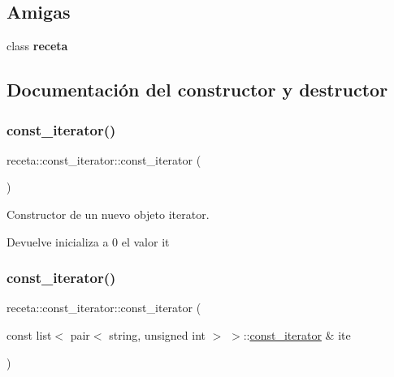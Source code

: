 \subsection*{Amigas}
\begin{DoxyCompactItemize}
\item 
\mbox{\label{classreceta_1_1const__iterator_a9843fe65258faad543f6aba1e066f9ac}} 
class {\bfseries receta}
\end{DoxyCompactItemize}


\subsection{Documentación del constructor y destructor}
\mbox{\label{classreceta_1_1const__iterator_aa31dafb4cc1e54d2ceef5b9575afaeb0}} 
\subsubsection{\texorpdfstring{const\+\_\+iterator()}{const\_iterator()}\hspace{0.1cm}{\footnotesize\ttfamily [1/3]}}
{\footnotesize\ttfamily receta\+::const\+\_\+iterator\+::const\+\_\+iterator (\begin{DoxyParamCaption}{ }\end{DoxyParamCaption})\hspace{0.3cm}{\ttfamily [inline]}}



Constructor de un nuevo objeto iterator. 

\begin{DoxyReturn}{Devuelve}
inicializa a 0 el valor it 
\end{DoxyReturn}
\mbox{\label{classreceta_1_1const__iterator_a057507cdac42e1a1cd940667bd3b6239}} 
\subsubsection{\texorpdfstring{const\+\_\+iterator()}{const\_iterator()}\hspace{0.1cm}{\footnotesize\ttfamily [2/3]}}
{\footnotesize\ttfamily receta\+::const\+\_\+iterator\+::const\+\_\+iterator (\begin{DoxyParamCaption}\item[{const list$<$ pair$<$ string, unsigned int $>$ $>$\+::\hyperlink{classreceta_1_1const__iterator}{const\+\_\+iterator} \&}]{ite }\end{DoxyParamCaption})\hspace{0.3cm}{\ttfamily [inline]}}



